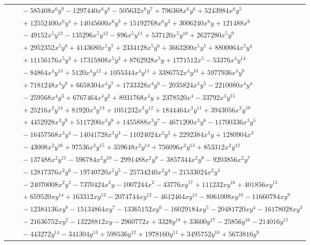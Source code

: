 \documentclass[11pt]{article}
\begin{document}
\begin{longtable}{@{}ll@{}}
 & $\quad -585408x^{6}y^{9}-1297440x^{6}y^{8}-505632x^{6}y^{7}+796368x^{6}y^{6}+5243984x^{6}y^{5}$\\
 & $\quad +12552400x^{6}y^{4}+14045600x^{6}y^{3}+15192768x^{6}y^{2}+3006240x^{6}y+121488x^{6}$\\
 & $\quad -49152x^{5}y^{13}-135296x^{5}y^{12}-896x^{5}y^{11}+537120x^{5}y^{10}+2627280x^{5}y^{9}$\\
 & $\quad +2952352x^{5}y^{8}+4143680x^{5}y^{7}+2334128x^{5}y^{6}+3663200x^{5}y^{5}+8800064x^{5}y^{4}$\\
 & $\quad +11156176x^{5}y^{3}+17315808x^{5}y^{2}+8762928x^{5}y+1771512x^{5}-53376x^{4}y^{14}$\\
 & $\quad -84864x^{4}y^{13}+5120x^{4}y^{12}+1055344x^{4}y^{11}+3386752x^{4}y^{10}+5977936x^{4}y^{9}$\\
 & $\quad +7181248x^{4}y^{8}+6658304x^{4}y^{7}+1733328x^{4}y^{6}-2035824x^{4}y^{5}-2210080x^{4}y^{4}$\\
 & $\quad -259568x^{4}y^{3}+6767464x^{4}y^{2}+8931768x^{4}y+2378520x^{4}-33792x^{3}y^{15}$\\
 & $\quad +25216x^{3}y^{14}+81920x^{3}y^{13}+1051232x^{3}y^{12}+1844464x^{3}y^{11}+3943056x^{3}y^{10}$\\
 & $\quad +4452928x^{3}y^{9}+5117200x^{3}y^{8}+1455888x^{3}y^{7}-4671200x^{3}y^{6}-11700336x^{3}y^{5}$\\
 & $\quad -16457568x^{3}y^{4}-14041728x^{3}y^{3}-11024024x^{3}y^{2}+2292384x^{3}y+1280904x^{3}$\\
 & $\quad -43008x^{2}y^{16}+97536x^{2}y^{15}+359648x^{2}y^{14}+756096x^{2}y^{13}+853312x^{2}y^{12}$\\
 & $\quad -137488x^{2}y^{11}-596784x^{2}y^{10}-2991488x^{2}y^{9}-3857344x^{2}y^{8}-9203856x^{2}y^{7}$\\
 & $\quad -12817376x^{2}y^{6}-19740720x^{2}y^{5}-25734240x^{2}y^{4}-21533024x^{2}y^{3}$\\
 & $\quad -24070008x^{2}y^{2}-7370424x^{2}y-1007244x^{2}-43776xy^{17}+111232xy^{16}+401856xy^{15}$\\
 & $\quad +659520xy^{14}+163312xy^{13}-2074744xy^{12}-4612464xy^{11}-8061008xy^{10}-11660784xy^{9}$\\
 & $\quad -12384136xy^{8}-15134864xy^{7}-13365152xy^{6}-16029184xy^{5}-20481720xy^{4}-16178028xy^{3}$\\
 & $\quad -21636752xy^{2}-13228812xy-2960772x+3328y^{18}+33600y^{17}-25856y^{16}-214016y^{15}$\\
 & $\quad -443272y^{14}-341304y^{13}+598536y^{12}+1978160y^{11}+3495752y^{10}+5673816y^{9}$\\

\end{longtable}
\end{document}
